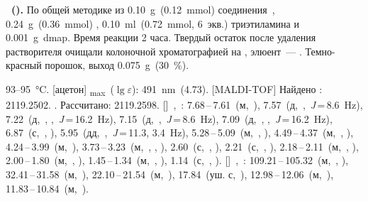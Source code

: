 \textbf{~().} 
По общей методике из \SI{0.10}{\gram}~(\SI{0.12}{\milli\mole}) соединения~, \SI{0.24}{\gram}~(\SI{0.36}{\milli\mole}) , \SI{0.10}{\milli\litre}~(\SI{0.72}{\milli\mole}, 6~экв.) триэтиламина и \SI{0.001}{\gram}~\ac{dmap}.
Время реакции 2 часа. Твердый остаток после удаления растворителя очищали колоночной хроматографией на , элюент~--- .
Темно-красный порошок, выход \SI{0.075}{\gram}~(\SI{30}{\percent}).
\begin{experimental}
     93--\SI{95}{\celsius}.
    [ацетон] \chemlambda\textsubscript{max}~($\lg \varepsilon$): \SI{491}{\nano\metre}~(4.73).
    [MALDI-TOF] Найдено \ce{[M - H]-}: \num{2119.2502}. . Рассчитано: \ce{[M - H]} \num{2119.2598}.
    []~\chemdelta,~\si{\ppm}: 7.68\,--\,7.61~(м,~), 7.57~(д,~,~\textit{J}\,=\,8.6~\si{\hertz}), 7.22~(д,~, ,~\textit{J}\,=\,16.2~\si{\hertz}), 7.15~(д,~,~\textit{J}\,=\,8.6~\si{\hertz}), 7.09~(д,~, ,~\textit{J}\,=\,16.2~\si{\hertz}), 6.87~(с,~, ), 5.95~(дд,~,~\textit{J}\,=\,11.3, 3.4~\si{\hertz}), 5.28\,--\,5.09~(м,~, ), 4.49\,--\,4.37~(м,~, ), 4.24\,--\,3.99~(м,~), 3.73\,--\,3.23~(м,~, , ), 2.60~(с,~, ), 2.21~(с,~, ), 2.18\,--\,2.11~(м,~, ), 2.00\,--\,1.80~(м,~, ), 1.45\,--\,1.34~(м,~, ), 1.14~(с,~, ).
    []~\chemdelta,~\si{\ppm}: 109.21\,--\,105.32~(м,~, ), 32.41\,--\,31.58~(м,~), 22.10\,--\,21.54~(м,~), 17.84~(уш. с,~), 12.98\,--\,12.06~(м,~), 11.83\,--\,10.84~(м,~).
\end{experimental}

